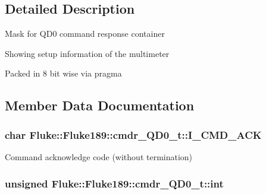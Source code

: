 \subsection{Detailed Description}
Mask for QD0 command response container\par
 Showing setup information of the multimeter\par
 Packed in 8 bit wise via pragma\par
 

\subsection{Member Data Documentation}
\hypertarget{structFluke_1_1Fluke189_1_1cmdr__QD0__t_ab46dd039cec29950bccb5090537d6272}{
\subsubsection[{I\_\-CMD\_\-ACK}]{\setlength{\rightskip}{0pt plus 5cm}char {\bf Fluke::Fluke189::cmdr\_\-QD0\_\-t::I\_\-CMD\_\-ACK}}}
\label{structFluke_1_1Fluke189_1_1cmdr__QD0__t_ab46dd039cec29950bccb5090537d6272}
Command acknowledge code (without termination) \hypertarget{structFluke_1_1Fluke189_1_1cmdr__QD0__t_a6ab6a1621f14f0fe83e89daadd9ba787}{
\subsubsection[{int}]{\setlength{\rightskip}{0pt plus 5cm}unsigned {\bf Fluke::Fluke189::cmdr\_\-QD0\_\-t::int}}}
\label{structFluke_1_1Fluke189_1_1cmdr__QD0__t_a6ab6a1621f14f0fe83e89daadd9ba787}


